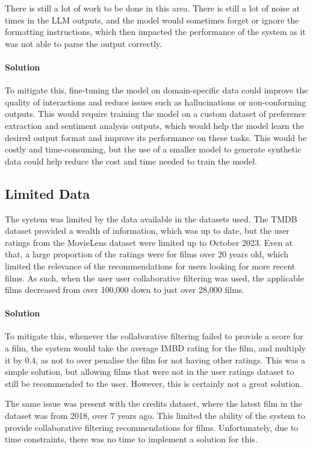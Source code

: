 There is still a lot of work to be done in this area. There is still a lot of noise at times in the LLM outputs, and the model would sometimes forget or ignore the formatting instructions, which then impacted the performance of the system as it was not able to parse the output correctly.
\paragraph{Solution} To mitigate this, fine-tuning the model on domain-specific data could improve the quality of interactions and reduce issues such as hallucinations or non-conforming outputs.
This would require training the model on a custom dataset of preference extraction and sentiment analysis outputs, which would help the model learn the desired output format and improve its performance on these tasks.
This would be costly and time-consuming, but the use of a smaller model to generate synthetic data could help reduce the cost and time needed to train the model.


\subsection{Limited Data}
\label{subsec:limited_data}
The system was limited by the data available in the datasets used. The TMDB dataset provided a wealth of information, which was up to date, but the user ratings from the MovieLens dataset were limited up to October 2023. Even at that, a large proportion of the ratings were for films over 20 years old, which limited the relevance of the recommendations for users looking for more recent films.
As such, when the user user collaborative filtering was used, the applicable films decreased from over 100,000 down to just over 28,000 films.

\paragraph{Solution} To mitigate this, whenever the collaborative filtering failed to provide a score for a film, the system would take the average IMBD rating for the film, and multiply it by 0.4, as not to over penalise the film for not having other ratings.
This was a simple solution, but allowing films that were not in the user ratings dataset to still be recommended to the user.
However, this is certainly not a great solution.

The same issue was present with the credits dataset, where the latest film in the dataset was from 2018, over 7 years ago.
This limited the ability of the system to provide collaborative filtering recommendations for films.
Unfortunately, due to time constraints, there was no time to implement a solution for this.



